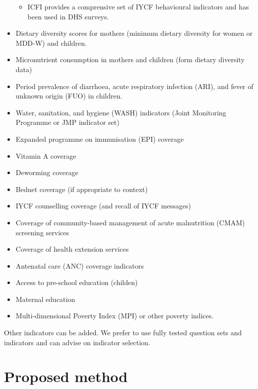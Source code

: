 \documentclass[12pt,a4paper]{article}
\providecommand{\tightlist}{%
  \setlength{\itemsep}{0pt}\setlength{\parskip}{0pt}}
\begin{document}
\begin{itemize}
  \begin{itemize}
  \tightlist
  \item
    ICFI provides a comprensive set of IYCF behavioural indicators and has been used in DHS surveys.
  \end{itemize}
\item
  Dietary diversity scores for mothers (minimum dietary diversity for women or MDD-W) and children.
\item
  Micronutrient consumption in mothers and children (form dietary diversity data)
\item
  Period prevalence of diarrhoea, acute respiratory infection (ARI), and fever of unknown origin (FUO) in children.
\item
  Water, sanitation, and hygiene (WASH) indicators (Joint Monitoring Programme or JMP indicator set)
\item
  Expanded programme on immunisation (EPI) coverage
\item
  Vitamin A coverage
\item
  Deworming coverage
\item
  Bednet coverage (if appropriate to context)
\item
  IYCF counselling coverage (and recall of IYCF messages)
\item
  Coverage of community-based management of acute malnutrition (CMAM) screening services
\item
  Coverage of health extension services
\item
  Antenatal care (ANC) coverage indicators
\item
  Access to pre-school education (childen)
\item
  Maternal education
\item
  Multi-dimensional Poverty Index (MPI) or other poverty indices.
\end{itemize}

Other indicators can be added. We prefer to use fully tested question sets and indicators and can advise on indicator selection.

\hypertarget{proposed-method}{%
\section{Proposed method}\label{proposed-method}}
\end{document}
